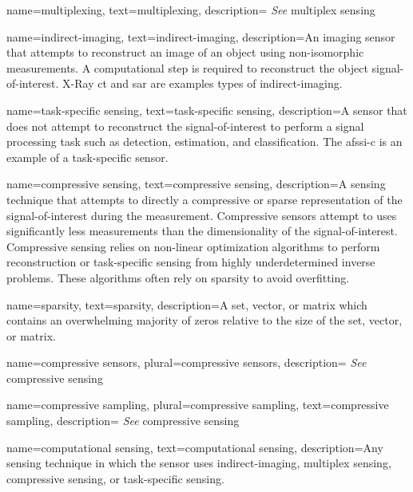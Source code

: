 {
name={multiplexing},
text={multiplexing},
description={ \emph{See} \gls{multiplex sensing}}
}

{
name={indirect-imaging},
text={indirect-imaging},
description={An imaging sensor that attempts to reconstruct an image of an object using non-isomorphic measurements. A computational step is required to reconstruct the object signal-of-interest. X-Ray \gls{ct} and \gls{sar} are examples types of indirect-imaging.  }
}

{
name={task-specific sensing},
text={task-specific sensing},
description={A sensor that does not attempt to reconstruct the signal-of-interest to perform a signal processing task such as detection, estimation, and classification. The \gls{afssi-c} is an example of a task-specific sensor. }
}

{
name={compressive sensing},
text={compressive sensing},
description={A sensing technique that attempts to directly a compressive or sparse representation of the signal-of-interest during the measurement. Compressive sensors attempt to uses significantly less measurements than the dimensionality of the signal-of-interest. Compressive sensing relies on non-linear optimization algorithms to perform reconstruction or task-specific sensing from highly underdetermined inverse problems. These algorithms often rely on sparsity to avoid overfitting.}
}

{
name={sparsity},
text={sparsity},
description={A set, vector, or matrix which contains an overwhelming majority of zeros relative to the size of the set, vector, or matrix. }
}



{
name={compressive sensors},
plural={compressive sensors},
description={ \emph{See} \gls{compressive sensing}}
}

{
name={compressive sampling},
plural={compressive sampling},
text={compressive sampling},
description={ \emph{See} \gls{compressive sensing}}
}

{
name={computational sensing},
text={computational sensing},
description={Any sensing technique in which the sensor uses \gls{indirect-imaging}, \gls{multiplex sensing}, \gls{compressive sensing}, or \gls{task-specific sensing}.}
}


